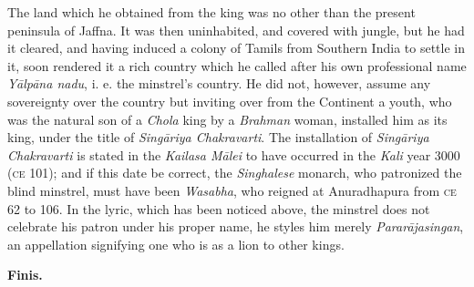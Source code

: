 \documentclass{article}
\begin{document}
The land which he obtained from the king was no other than the present peninsula of Jaffna. It was then uninhabited, and covered with jungle, but he had it cleared, and having induced a colony of Tamils from Southern India to settle in it, soon rendered it a rich country which he called after his own professional name \emph{Y\={a}lp\={a}na nadu}, i. e. the minstrel's country. He did not, however, assume any sovereignty over the country but inviting over from the Continent a youth, who was the natural son of a \emph{Chola} king by a \emph{Brahman} woman, installed him as its king, under the title of \emph{Sing\={a}riya Chakravarti}. The installation of \emph{Sing\={a}riya Chakravarti} is stated in the \emph{Kailasa M\={a}lei} to have occurred in the \emph{Kali} year 3000 (\textsc{ce} 101); and if this date be correct, the \emph{Singhalese} monarch, who patronized the blind minstrel, must have been \emph{Wasabha}, who reigned at Anuradhapura from \textsc{ce} 62 to 106. In the lyric, which has been noticed above, the minstrel does not celebrate his patron under his proper name, he styles him merely \emph{Parar\={a}jasingan}, an appellation signifying one who is as a lion to other kings.

\begin{center}
\textbf{Finis.}
\end{center}
\end{document}
